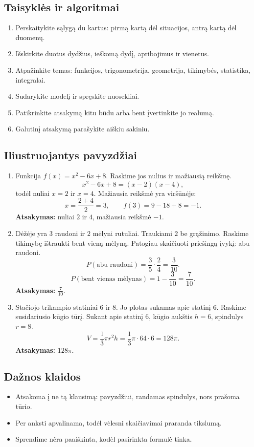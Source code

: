 \subsection{Taisyklės ir algoritmai}
\begin{enumerate}[label=\arabic*.]
\item Perskaitykite sąlygą du kartus: pirmą kartą dėl situacijos, antrą kartą dėl duomenų.
\item Išskirkite duotus dydžius, ieškomą dydį, apribojimus ir vienetus.
\item Atpažinkite temas: funkcijos, trigonometrija, geometrija, tikimybės, statistika, integralai.
\item Sudarykite modelį ir spręskite nuosekliai.
\item Patikrinkite atsakymą kitu būdu arba bent įvertinkite jo realumą.
\item Galutinį atsakymą parašykite aiškiu sakiniu.
\end{enumerate}

\subsection{Iliustruojantys pavyzdžiai}
\begin{enumerate}[label=\arabic*.]
\item Funkcija \(f(x)=x^2-6x+8\). Raskime jos nulius ir mažiausią reikšmę.
\[
x^2-6x+8=(x-2)(x-4),
\]
todėl nuliai \(x=2\) ir \(x=4\). Mažiausia reikšmė yra viršūnėje:
\[
x=\frac{2+4}{2}=3,\qquad f(3)=9-18+8=-1.
\]
\textbf{Atsakymas:} nuliai \(2\) ir \(4\), mažiausia reikšmė \(-1\).

\item Dėžėje yra \(3\) raudoni ir \(2\) mėlyni rutuliai. Traukiami \(2\) be grąžinimo. Raskime tikimybę ištraukti bent vieną mėlyną.
Patogiau skaičiuoti priešingą įvykį: abu raudoni.
\[
P(\text{abu raudoni})=\frac35\cdot\frac24=\frac3{10}.
\]
\[
P(\text{bent vienas mėlynas})=1-\frac3{10}=\frac7{10}.
\]
\textbf{Atsakymas:} \(\frac7{10}\).

\item Stačiojo trikampio statiniai \(6\) ir \(8\). Jo plotas sukamas apie statinį \(6\). Raskime susidariusio kūgio tūrį.
Sukant apie statinį \(6\), kūgio aukštis \(h=6\), spindulys \(r=8\).
\[
V=\frac13\pi r^2h=\frac13\pi\cdot64\cdot6=128\pi.
\]
\textbf{Atsakymas:} \(128\pi\).
\end{enumerate}

\subsection{Dažnos klaidos}
\begin{itemize}
\item Atsakoma į ne tą klausimą: pavyzdžiui, randamas spindulys, nors prašoma tūrio.
\item Per anksti apvalinama, todėl vėlesni skaičiavimai praranda tikslumą.
\item Sprendime nėra paaiškinta, kodėl pasirinkta formulė tinka.
\end{itemize}

